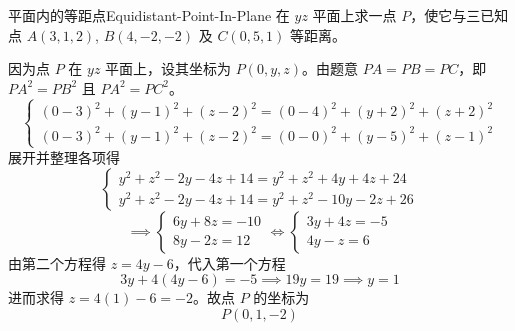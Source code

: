 \begin{problem}{平面内的等距点}{Equidistant-Point-In-Plane}
    在 $yz$ 平面上求一点 $P$，使它与三已知点 $A(3, 1, 2)$, $B(4, -2, -2)$ 及 $C(0, 5, 1)$ 等距离。
\end{problem}

\begin{solution}
    因为点 $P$ 在 $yz$ 平面上，设其坐标为 $P(0, y, z)$。由题意 $PA = PB = PC$，即 $PA^2 = PB^2$ 且 $PA^2 = PC^2$。
    \begin{equation}
        \begin{cases}
            (0 - 3)^2 + (y - 1)^2 + (z - 2)^2 = (0 - 4)^2 + (y + 2)^2 + (z + 2)^2 \\
            (0 - 3)^2 + (y - 1)^2 + (z - 2)^2 = (0 - 0)^2 + (y - 5)^2 + (z - 1)^2
        \end{cases}
    \end{equation}
    展开并整理各项得
    \begin{equation}
        \begin{cases}
            y^2 + z^2 - 2y - 4z + 14 = y^2 + z^2 + 4y + 4z + 24 \\
            y^2 + z^2 - 2y - 4z + 14 = y^2 + z^2 - 10y - 2z + 26
        \end{cases}
    \end{equation}
    \begin{equation}
        \implies
        \begin{cases}
            6y + 8z = -10 \\
            8y - 2z = 12
        \end{cases}
        \iff
        \begin{cases}
            3y + 4z = -5 \\
            4y - z = 6
        \end{cases}
    \end{equation}
    由第二个方程得 $z = 4y - 6$，代入第一个方程
    \begin{equation}
        3y + 4(4y - 6) = -5 \implies 19y = 19 \implies y = 1
    \end{equation}
    进而求得 $z = 4(1) - 6 = -2$。故点 $P$ 的坐标为
    \begin{equation}
        \boxed{P(0, 1, -2)}
    \end{equation}
\end{solution}

\endinput
